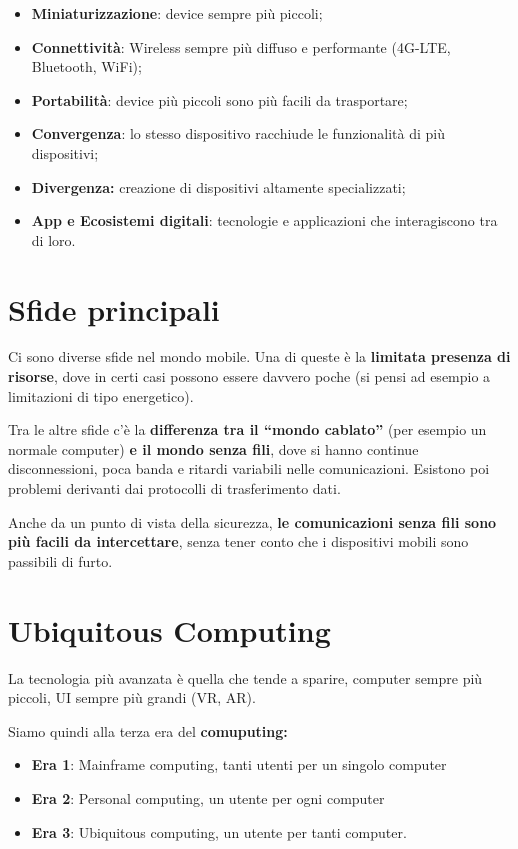 \begin{itemize}
\item \textbf{Miniaturizzazione}: device sempre più piccoli;
\item \textbf{Connettività}: Wireless sempre più diffuso e performante
  (4G-LTE, Bluetooth, WiFi);
\item \textbf{Portabilità}: device più piccoli sono più facili da
  trasportare;
\item \textbf{Convergenza}: lo stesso dispositivo racchiude le funzionalità
  di più dispositivi;
\item \textbf{Divergenza:} creazione di dispositivi altamente specializzati;
\item \textbf{App e Ecosistemi digitali}: tecnologie e applicazioni che
  interagiscono tra di loro.
\end{itemize}

\section{Sfide principali}

Ci sono diverse sfide nel mondo mobile. Una di queste è la \textbf{limitata
presenza di risorse}, dove in certi casi possono essere davvero poche (si pensi
ad esempio a limitazioni di tipo energetico).

Tra le altre sfide c'è la \textbf{differenza tra il ``mondo cablato''} (per
esempio un normale computer) \textbf{e il mondo senza fili}, dove si hanno
continue disconnessioni, poca banda e ritardi variabili nelle comunicazioni.
Esistono poi problemi derivanti dai protocolli di trasferimento dati.

Anche da un punto di vista della sicurezza, \textbf{le comunicazioni senza fili
sono più facili da intercettare}, senza tener conto che i dispositivi mobili
sono passibili di furto.

\section{Ubiquitous Computing }
\label{ubiquitous-computing}

La tecnologia più avanzata è quella che tende a sparire, computer sempre
più piccoli, UI sempre più grandi (VR, AR).

Siamo quindi alla terza era del \textbf{comuputing:}

\begin{itemize}
\item \textbf{Era 1}: Mainframe computing, tanti utenti per un singolo computer
\item \textbf{Era 2}: Personal computing, un utente per ogni computer
\item \textbf{Era 3}: Ubiquitous computing, un utente per tanti computer.

\end{itemize}

